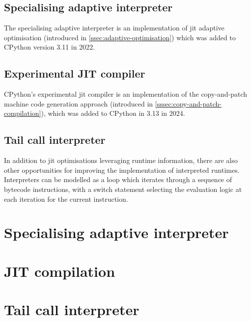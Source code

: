 \subsection{Specialising adaptive interpreter}
\label{ssec:specialising-adaptive-interpreter}


The specialising adaptive interpreter is an implementation of \ac{jit} adaptive optimisation (introduced in \autoref{ssec:adaptive-optimisation}) which was added to CPython version 3.11 in 2022.



\subsection{Experimental JIT compiler}
\label{ssec:experimental-jit-compiler}

CPython's experimental \ac{jit} compiler is an implementation of the copy-and-patch machine code generation approach (introduced in \autoref{sssec:copy-and-patch-compilation}), which was added to CPython in 3.13 in 2024.


\subsection{Tail call interpreter}
\label{ssec:tail-call-interpreter}

In addition to \ac{jit} optimisations leveraging runtime information, there are also other opportunities for improving the implementation of interpreted runtimes.
Interpreters can be modelled as a loop which iterates through a sequence of bytecode instructions, with a switch statement selecting the evaluation logic at each iteration for the current instruction.




\section{Specialising adaptive interpreter}
\section{JIT compilation}
\section{Tail call interpreter}


